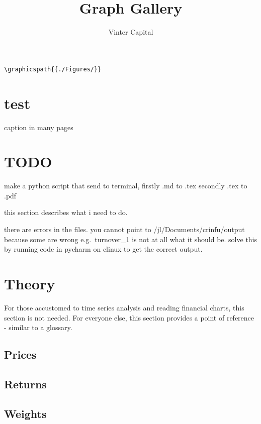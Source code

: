 \documentclass[12,]{article}
\title{Graph Gallery}
\author{Vinter Capital}
\date{}
\begin{document}
\maketitle

{
\setcounter{tocdepth}{2}
\tableofcontents
}
\begin{verbatim}
\graphicspath{{./Figures/}}
\end{verbatim}

\section{test}\label{test}

caption in many pages

\section{TODO}\label{todo}

make a python script that send to terminal, firstly .md to .tex secondly
.tex to .pdf

this section describes what i need to do.

there are errors in the files. you cannot point to
/jl/Documents/crinfu/output because some are wrong e.g.~turnover\_1 is
not at all what it should be. solve this by running code in pycharm on
clinux to get the correct output.

\section{Theory}\label{theory}

For those accustomed to time series analysis and reading financial
charts, this section is not needed. For everyone else, this section
provides a point of reference - similar to a glossary.

\subsection{Prices}\label{prices}

\subsection{Returns}\label{returns}

\subsection{Weights}\label{weights}
\end{document}
